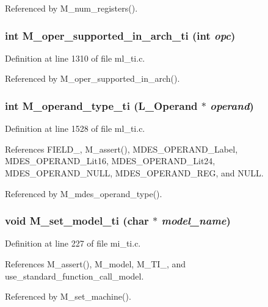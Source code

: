 Referenced by M\_\-num\_\-registers().
\subsubsection{\setlength{\rightskip}{0pt plus 5cm}int M\_\-oper\_\-supported\_\-in\_\-arch\_\-ti (int {\em opc})}\label{m__ti_8h_63f22360123194536bc972d29360084c}




Definition at line 1310 of file ml\_\-ti.c.

Referenced by M\_\-oper\_\-supported\_\-in\_\-arch().
\subsubsection{\setlength{\rightskip}{0pt plus 5cm}int M\_\-operand\_\-type\_\-ti (L\_\-Operand $\ast$ {\em operand})}\label{m__ti_8h_f9b61d1bc511d8028dffc27b75ba4cf7}




Definition at line 1528 of file ml\_\-ti.c.

References FIELD\_, M\_\-assert(), MDES\_\-OPERAND\_\-Label, MDES\_\-OPERAND\_\-Lit16, MDES\_\-OPERAND\_\-Lit24, MDES\_\-OPERAND\_\-NULL, MDES\_\-OPERAND\_\-REG, and NULL.

Referenced by M\_\-mdes\_\-operand\_\-type().
\subsubsection{\setlength{\rightskip}{0pt plus 5cm}void M\_\-set\_\-model\_\-ti (char $\ast$ {\em model\_\-name})}\label{m__ti_8h_9454cdab1f936078b7fa2353895079b1}




Definition at line 227 of file mi\_\-ti.c.

References M\_\-assert(), M\_\-model, M\_\-TI\_, and use\_\-standard\_\-function\_\-call\_\-model.

Referenced by M\_\-set\_\-machine().
